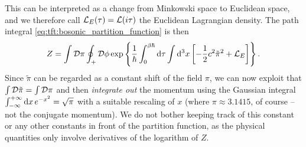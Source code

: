This can be interpreted as a change from Minkowski space to Euclidean space, and we therefore call $\mathcal{L}_E(\tau) = \mathcal{L}(i \tau)$ the Euclidean Lagrangian density.
The path integral \eqref{eq:tft:bosonic_partition_function} is then
\begin{equation}
	Z = \int \mathcal{D} \pi \oint_+ \mathcal{D} \phi \exp \left\{ \frac{1}{\hbar} \int_0^{\beta \hbar} \mathop{}\!\mathrm{d} \tau \int \mathop{}\!\mathrm{d}^3 x \left[ - \frac12 c^2 \tilde\pi^2 + \mathcal{L}_E \right] \right\} .
\end{equation}
Since $\tilde\pi$ can be regarded as a constant shift of the field $\pi$, we can now exploit that $\int \mathcal{D} \tilde\pi = \int \mathcal{D} \pi$ and then \emph{integrate out} the momentum using the Gaussian integral $\int_{-\infty}^{+\infty} \mathop{}\!\mathrm{d} x \, e^{-x^2} = \sqrt{\pi}$ with a suitable rescaling of $x$ (where $\pi \approx 3.1415$, of course -- not the conjugate momentum).
We do not bother keeping track of this constant or any other constants in front of the partition function, as the physical quantities only involve derivatives of the logarithm of $Z$.



